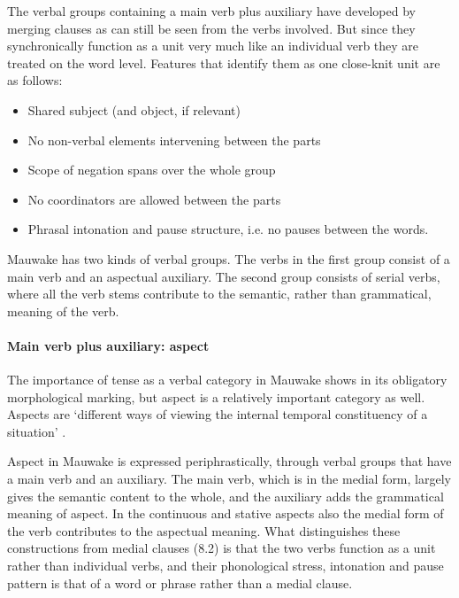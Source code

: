 The verbal groups containing a main verb plus auxiliary have developed by merging clauses as can still be seen from the verbs involved. But since they synchronically function as a unit very much like an individual verb they are treated on the word level. Features that identify them as one close-knit unit are as follows:

\begin{itemize}
\item Shared subject (and object, if relevant)
\item No non-verbal elements intervening between the parts
\item Scope of negation spans over the whole group
\item No coordinators are allowed between the parts
\item Phrasal intonation and pause structure, i.e. no pauses between the words.
\end{itemize}

Mauwake has two kinds of verbal groups. The verbs in the first group consist of a main verb and an aspectual auxiliary. The second group consists of serial verbs, where all the verb stems contribute to the semantic, rather than grammatical, meaning of the verb.

\paragraph[Main verb plus auxiliary: aspect]{Main verb plus auxiliary: aspect}
{}
The importance of tense as a verbal category in Mauwake shows in its obligatory morphological marking, but aspect is a relatively important category as well. Aspects are `{different ways of viewing the internal temporal constituency of a situation}' \citep[3]{Comrie1976}. 

Aspect in Mauwake is expressed periphrastically, through verbal groups that have a main verb and an auxiliary. The main verb, which is in the medial form, largely gives the semantic content to the whole, and the auxiliary adds the grammatical meaning of aspect. In the continuous and stative aspects also the medial form of the  verb contributes to the aspectual meaning. What distinguishes these constructions from medial clauses (8.2) is that the two verbs function as a unit rather than individual verbs, and their phonological stress, intonation and pause pattern is that of a word or phrase rather than a medial clause. 


